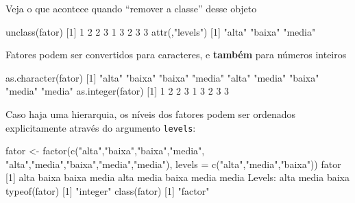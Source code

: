 \documentclass[
  10pt,
  a4paper]{book}
\newenvironment{Shaded}{\begin{snugshade}}{\end{snugshade}}
\newcommand{\AttributeTok}[1]{\textcolor[rgb]{0.77,0.63,0.00}{#1}}
\newcommand{\DecValTok}[1]{\textcolor[rgb]{0.00,0.00,0.81}{#1}}
\newcommand{\FunctionTok}[1]{\textcolor[rgb]{0.00,0.00,0.00}{#1}}
\newcommand{\NormalTok}[1]{#1}
\newcommand{\OtherTok}[1]{\textcolor[rgb]{0.56,0.35,0.01}{#1}}
\newcommand{\SpecialCharTok}[1]{\textcolor[rgb]{0.00,0.00,0.00}{#1}}
\newcommand{\StringTok}[1]{\textcolor[rgb]{0.31,0.60,0.02}{#1}}
\begin{document}
Veja o que acontece quando ``remover a classe'' desse objeto

\begin{Shaded}
\begin{Highlighting}[]
\FunctionTok{unclass}\NormalTok{(fator)}
\NormalTok{[}\DecValTok{1}\NormalTok{] }\DecValTok{1} \DecValTok{2} \DecValTok{2} \DecValTok{3} \DecValTok{1} \DecValTok{3} \DecValTok{2} \DecValTok{3} \DecValTok{3}
\FunctionTok{attr}\NormalTok{(,}\StringTok{"levels"}\NormalTok{)}
\NormalTok{[}\DecValTok{1}\NormalTok{] }\StringTok{"alta"}  \StringTok{"baixa"} \StringTok{"media"}
\end{Highlighting}
\end{Shaded}

Fatores podem ser convertidos para caracteres, e \textbf{também} para números
inteiros

\begin{Shaded}
\begin{Highlighting}[]
\FunctionTok{as.character}\NormalTok{(fator)}
\NormalTok{[}\DecValTok{1}\NormalTok{] }\StringTok{"alta"}  \StringTok{"baixa"} \StringTok{"baixa"} \StringTok{"media"} \StringTok{"alta"}  \StringTok{"media"} \StringTok{"baixa"} \StringTok{"media"} \StringTok{"media"}
\FunctionTok{as.integer}\NormalTok{(fator)}
\NormalTok{[}\DecValTok{1}\NormalTok{] }\DecValTok{1} \DecValTok{2} \DecValTok{2} \DecValTok{3} \DecValTok{1} \DecValTok{3} \DecValTok{2} \DecValTok{3} \DecValTok{3}
\end{Highlighting}
\end{Shaded}

Caso haja uma hierarquia, os níveis dos fatores podem ser ordenados
explicitamente através do argumento \texttt{levels}:

\begin{Shaded}
\begin{Highlighting}[]
\NormalTok{fator }\OtherTok{\textless{}{-}} \FunctionTok{factor}\NormalTok{(}\FunctionTok{c}\NormalTok{(}\StringTok{"alta"}\NormalTok{,}\StringTok{"baixa"}\NormalTok{,}\StringTok{"baixa"}\NormalTok{,}\StringTok{"media"}\NormalTok{,}
                  \StringTok{"alta"}\NormalTok{,}\StringTok{"media"}\NormalTok{,}\StringTok{"baixa"}\NormalTok{,}\StringTok{"media"}\NormalTok{,}\StringTok{"media"}\NormalTok{),}
                \AttributeTok{levels =} \FunctionTok{c}\NormalTok{(}\StringTok{"alta"}\NormalTok{,}\StringTok{"media"}\NormalTok{,}\StringTok{"baixa"}\NormalTok{))}
\NormalTok{fator}
\NormalTok{[}\DecValTok{1}\NormalTok{] alta  baixa baixa media alta  media baixa media media}
\NormalTok{Levels}\SpecialCharTok{:}\NormalTok{ alta media baixa}
\FunctionTok{typeof}\NormalTok{(fator)}
\NormalTok{[}\DecValTok{1}\NormalTok{] }\StringTok{"integer"}
\FunctionTok{class}\NormalTok{(fator)}
\NormalTok{[}\DecValTok{1}\NormalTok{] }\StringTok{"factor"}
\end{Highlighting}
\end{Shaded}
\end{document}
